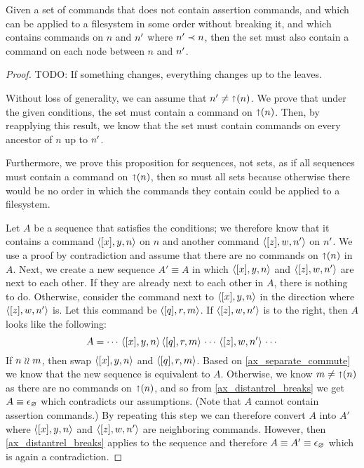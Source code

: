 \begin{mylem}
Given a set of commands that
does not contain assertion commands,
and which can be applied to a filesystem in some order without breaking it,
and which contains commands on $n$ and $n'$ where $n'\prec n$,
then the set must also contain a command
on each node between $n$ and $n'$.
\end{mylem}
\begin{proof}
TODO: If something changes, everything changes up to the leaves.

Without loss of generality, we can assume that $n'\neq\mathord{\shortuparrow}(n)$.
We prove that under the given conditions, the set must contain a command on $\mathord{\shortuparrow}(n)$.
Then, by reapplying this result, we know that the set must contain commands on every
ancestor of $n$ up to $n'$.

Furthermore,
we prove this proposition for sequences, not sets, as if all sequences must contain a command on $\mathord{\shortuparrow}(n)$,
then so must all sets because otherwise there would be no order in which the commands they contain could be
applied to a filesystem.

Let $A$ be a sequence that satisfies the conditions;
we therefore know that it contains a command $\langle{[x],y,n}\rangle$ on $n$
and another command $\langle{[z],w,n'}\rangle$ on $n'$.
We use a proof by contradiction and assume that there are no commands on $\mathord{\shortuparrow}(n)$ in $A$.
Next, we create a new sequence $A'\equiv A$ in which $\langle{[x],y,n}\rangle$ and $\langle{[z],w,n'}\rangle$ are next to each other.
If they are already next to each other in $A$, there is nothing to do.
Otherwise, consider the command next to $\langle{[x],y,n}\rangle$ in the direction where $\langle{[z],w,n'}\rangle$ is.
Let this command be $\langle{[q],r,m}\rangle$.
If $\langle{[z],w,n'}\rangle$ is to the right, then $A$ looks like the following:
\[ A = \cdots\,\langle{[x],y,n}\rangle\,\langle{[q],r,m}\rangle\,\cdots\,\langle{[z],w,n'}\rangle\,\cdots \]
If $n\mathrel{\wr\wr} m$, then swap $\langle{[x],y,n}\rangle$ and $\langle{[q],r,m}\rangle$. Based on \cref{ax_separate_commute} we know that the new
sequence is equivalent to $A$.
Otherwise, we know $m\neq\mathord{\shortuparrow}(n)$ as there are no commands on $\mathord{\shortuparrow}(n)$, and so
from \cref{ax_distantrel_breaks} we get $A\equiv\epsilon_\varnothing$ which contradicts our assumptions.
(Note that $A$ cannot contain assertion commands.)
By repeating this step we can therefore convert $A$ into $A'$ where $\langle{[x],y,n}\rangle$ and $\langle{[z],w,n'}\rangle$ are neighboring commands.
However, then \cref{ax_distantrel_breaks} applies to the sequence and therefore $A\equiv A'\equiv\epsilon_\varnothing$ which
is again a contradiction.
\end{proof}


